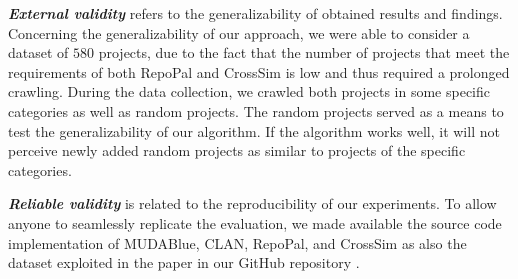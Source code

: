 \textit{\textbf{External validity}}  refers to the generalizability of obtained results and findings. Concerning the generalizability of our approach, we were able to consider a dataset of $580$ projects, due to the fact that the number of projects that meet the requirements of both RepoPal and CrossSim is low and thus required a prolonged crawling. During the data collection, we crawled both projects in some specific categories as well as random projects. The random projects served as a means to test the generalizability of our algorithm. If the algorithm works well, it will not perceive newly added random projects as similar to projects of the specific categories.

\textit{\textbf{Reliable validity}}  is related to the reproducibility of our experiments. To allow anyone to seamlessly replicate the evaluation, we made available the source code implementation of MUDABlue, CLAN, RepoPal, and CrossSim as also the dataset exploited in the paper in our GitHub repository \cite{CROSSSIM-DATA}.